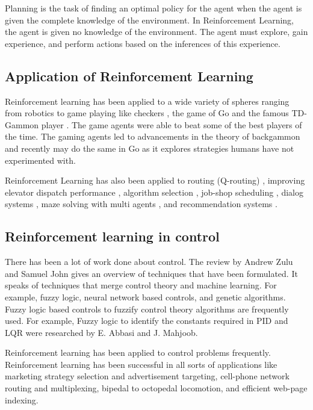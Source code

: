 \documentclass[hidelinks,BTech]{iitmdiss}
\begin{document}

Planning is the task of finding an optimal policy for the agent when the agent is given the complete knowledge of the environment. In Reinforcement Learning, the agent is given no knowledge of the environment. The agent must explore, gain experience, and perform actions based on the inferences of this experience.

\subsection{Application of Reinforcement Learning}
Reinforcement learning has been applied to a wide variety of spheres ranging from robotics \cite{HelicopterPegasus} to game playing like checkers \cite{RLInCheckers}, the game of Go \cite{RLInGo} and the famous TD-Gammon player \cite{RLInBackgammon}. The game agents were able to beat some of the best players of the time. The gaming agents led to advancements in the theory of backgammon and recently may do the same in Go as it explores strategies humans have not experimented with.

Reinforcement Learning has also been applied to routing (Q-routing) \cite{RLInQRouting},
improving elevator dispatch performance \cite{RLInElevators}, algorithm
selection \cite{RLInAlgoSelection}, job-shop scheduling \cite{RLInJobShopScheduling}, dialog systems \cite{RLInDialogSystems}, maze solving with multi agents \cite{PredatorPrey}, and recommendation systems \cite{RLInRecommenders}.

\subsection{Reinforcement learning in control}

There has been a lot of work done about control. The review \cite{ControlForQuads} by Andrew Zulu and Samuel John gives an overview of techniques that have been formulated. It speaks of techniques that merge control theory and machine learning. For example, fuzzy logic, neural network based controls, and genetic algorithms. Fuzzy logic based controls to fuzzify control theory algorithms are frequently used. For example, Fuzzy logic to identify the constants required in PID and LQR were researched by E. Abbasi and J. Mahjoob.

Reinforcement learning has been applied to control problems frequently. Reinforcement learning has been successful in all sorts of applications like marketing strategy selection and advertisement targeting, cell-phone network routing and multiplexing, bipedal to octopedal locomotion, and efficient web-page indexing.
\end{document}
